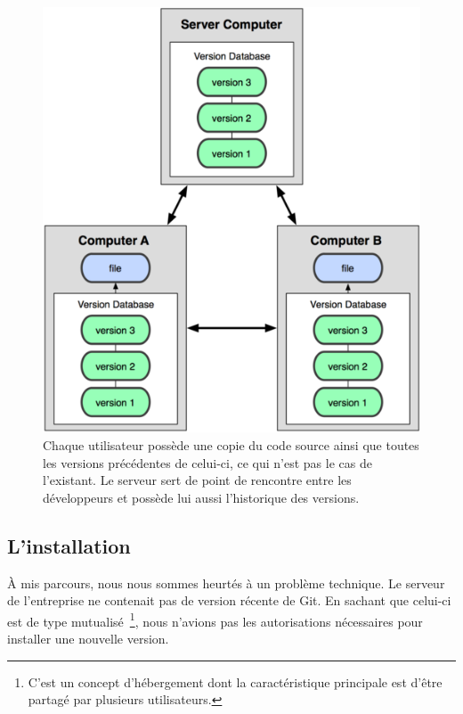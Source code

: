 \begin{figure}
  \begin{center}
    \includegraphics[scale=1.57]{images/workflow.png}
    \caption{ Chaque utilisateur possède une copie du code source
    ainsi que toutes les versions précédentes de celui-ci, ce qui n'est pas
    le cas de l'existant. Le serveur sert de point de rencontre entre les
    développeurs et possède lui aussi l’historique des versions.}
    \label{flow}
  \end{center}
\end{figure}

\subsection{L'installation} %
\label{sub:L'installation}

À mis parcours, nous nous sommes heurtés à un problème technique. Le
serveur de l'entreprise ne contenait pas de version récente de Git. En
sachant que celui-ci est de type mutualisé\, \footnote{C'est un concept
d'hébergement dont la caractéristique principale est d'être partagé par
plusieurs utilisateurs.}, nous n'avions pas les autorisations
nécessaires pour installer une nouvelle version.

